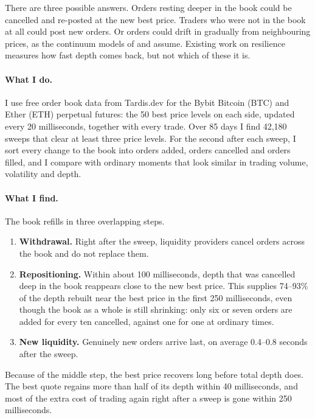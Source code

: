 \documentclass[12pt]{article}
\begin{document}
There are three possible answers. Orders resting deeper in the book could be cancelled and
re-posted at the new best price. Traders who were not in the book at all could post new orders.
Or orders could drift in gradually from neighbouring prices, as the continuum models of
\citet{donier2015minimal} and \citet{cont2021spde} assume. Existing work on resilience
\citep{large2007resiliency,obizhaeva2013optimal} measures how fast depth comes back, but not
which of these it is.

\paragraph{What I do.} I use free order book data from Tardis.dev \citep{tardis} for the Bybit
Bitcoin (BTC) and Ether (ETH) perpetual futures: the 50 best price levels on each side, updated
every 20 milliseconds, together with every trade. Over 85 days I find 42{,}180 sweeps that clear
at least three price levels. For the second after each sweep, I sort every change to the book
into orders added, orders cancelled and orders filled, and I compare with ordinary moments that
look similar in trading volume, volatility and depth.

\paragraph{What I find.} The book refills in three overlapping steps.
\begin{enumerate}
  \item \textbf{Withdrawal.} Right after the sweep, liquidity providers cancel orders across the
        book and do not replace them.
  \item \textbf{Repositioning.} Within about 100 milliseconds, depth that was cancelled deep in
        the book reappears close to the new best price. This supplies 74--93\% of the depth
        rebuilt near the best price in the first 250 milliseconds, even though the book as a
        whole is still shrinking: only six or seven orders are added for every ten cancelled,
        against one for one at ordinary times.
  \item \textbf{New liquidity.} Genuinely new orders arrive last, on average 0.4--0.8 seconds
        after the sweep.
\end{enumerate}
Because of the middle step, the best price recovers long before total depth does. The best
quote regains more than half of its depth within 40 milliseconds, and most of the extra cost of
trading again right after a sweep is gone within 250 milliseconds.
\end{document}
